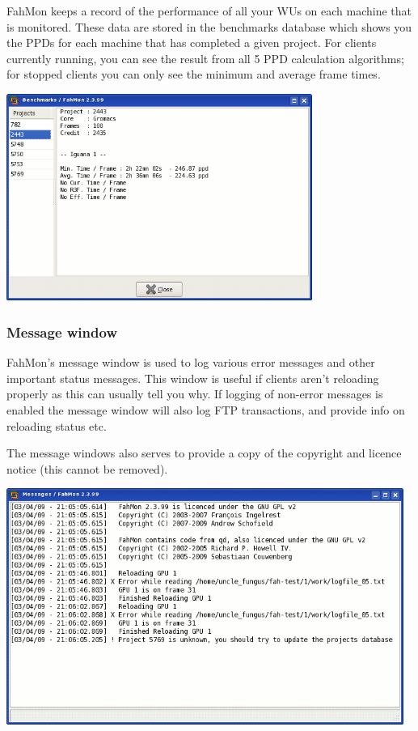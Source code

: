 FahMon keeps a record of the performance of all your WUs on each machine that is
monitored. These data are stored in the benchmarks database which shows you the
PPDs for each machine that has completed a given project. For clients currently
running, you can see the result from all 5 PPD calculation algorithms; for
stopped clients you can only see the minimum and average frame times.

\begin{center}
 \includegraphics[width=10cm]{6.png}
\end{center}

\subsubsection{Message window}

FahMon's message window is used to log various error messages and other
important status messages. This window is useful if clients aren't reloading
properly as this can usually tell you why. If logging of non-error messages is
enabled the message window will also log FTP transactions, and provide info on
reloading status etc.

The message windows also serves to provide a copy of the copyright and licence
notice (this cannot be removed).

\begin{center}
 \includegraphics[width=13cm]{7.png}
\end{center}


